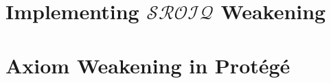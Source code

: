 \section{Implementing \texorpdfstring{$\mathcal{SROIQ}$}{SROIQ} Weakening}



\section{Axiom Weakening in Protégé}


